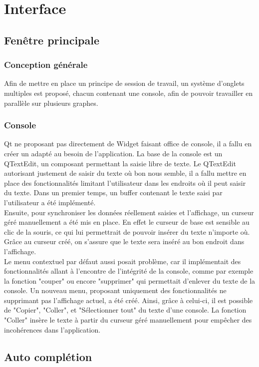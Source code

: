 \documentclass[french]{article}
\begin{document}
	\section{Interface}
		\subsection{Fenêtre principale}
			\subsubsection{Conception générale}
				Afin de mettre en place un principe de session de travail, un système d'onglets multiples est proposé, chacun contenant une console, afin de pouvoir travailler en parallèle sur plusieurs graphes.
			\subsubsection{Console}
				Qt ne proposant pas directement de Widget faisant office de console, il a fallu en créer un adapté au besoin de l'application. La base de la console est un QTextEdit, un composant permettant la saisie libre de texte. Le QTextEdit autorisant justement de saisir du texte où bon nous semble, il a fallu mettre en place des fonctionnalités limitant l'utilisateur dans les endroits où il peut saisir du texte. Dans un premier temps, un buffer contenant le texte saisi par l'utilisateur a été implémenté.\\
				Ensuite, pour synchroniser les données réellement saisies et l'affichage, un curseur géré manuellement a été mis en place. En effet le curseur de base est sensible au clic de la souris, ce qui lui permettrait de pouvoir insérer du texte n'importe où. Grâce au curseur créé, on s'assure que le texte sera inséré au bon endroit dans l'affichage.\\
				Le menu contextuel par défaut aussi posait problème, car il implémentait des fonctionnalités allant à l'encontre de l'intégrité de la console, comme par exemple la fonction "couper" ou encore "supprimer" qui permettait d'enlever du texte de la console. Un nouveau menu, proposant uniquement des fonctionnalités ne supprimant pas l'affichage actuel, a été créé. Ainsi, grâce à celui-ci, il est possible de "Copier", "Coller", et "Sélectionner tout" du texte d'une console. La fonction "Coller" insère le texte à partir du curseur géré manuellement pour empêcher des incohérences dans l'application.
		\subsection{Auto complétion}
\end{document}
